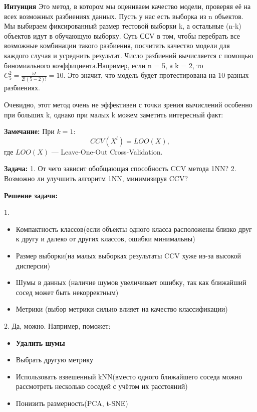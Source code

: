 \bigskip
\textbf{Интуиция}
Это метод, в котором мы оцениваем качество модели, проверяя её на всех возможных разбиениях данных. Пусть у нас есть выборка из n объектов. Мы выбираем фиксированный размер тестовой выборки k, а остальные (n-k) объектов идут в обучающую выборку. Суть ССV в том, чтобы перебрать все возможные комбинации такого разбиения, посчитать качество модели для каждого случая и усреднить результат. Число разбиений вычисляется с помощью биномиального коэффициента.Например, если n = 5, а k = 2, то $C_5^2 = \frac{5!}{2!(5-2)!} = 10$. Это значит, что модель будет протестирована на 10 разных разбиениях.

Очевидно, этот метод очень не эффективен с точки зрения вычислений особенно при больших k, однако при малых k можем заметить интересный факт:

\bigskip

\textbf{Замечание:} При \(k = 1\):  
$$ CCV(X^l) = LOO(X),$$ 
где $LOO(X)$ — Leave-One-Out Cross-Validation.  

\bigskip

\textbf{Задача:} 
1. От чего зависит обобщающая способность CCV метода 1NN?  
2. Возможно ли улучшить алгоритм 1NN, минимизируя CCV?  

\bigskip

\textbf{Решение задачи:}

1. 
    \begin{itemize}
        \item Компактность классов(если объекты одного класса расположены близко друг к другу и далеко от других классов, ошибки минимальны)
        \item Размер выборки(на малых выборках результаты CCV хуже из-за высокой дисперсии)
        \item Шумы в данных (наличие шумов увеличивает ошибку, так как ближайший сосед может быть некорректным)
        \item Метрики (выбор метрики сильно влияет на качество классификации)
    \end{itemize}
   
\bigskip

2.   Да, можно. Например, поможет:  

   \begin{itemize}
       \item \textbf{Удалить шумы}
       \item Выбрать другую метрику
       \item Использовать взвешенный kNN(вместо одного ближайшего соседа можно рассмотреть несколько соседей с учётом их расстояний)
       \item Понизить размерность(PCA, t-SNE)
   \end{itemize}

